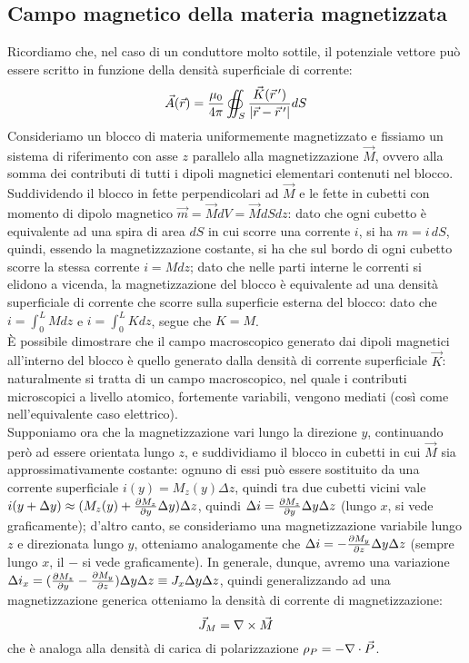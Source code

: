 \subsection{Campo magnetico della materia magnetizzata}

Ricordiamo che, nel caso di un conduttore molto sottile, il potenziale vettore può essere scritto in funzione della densità superficiale di corrente:
\begin{equation}
	\vec{A}(\vec{r}) = \frac{\mu_0}{4\pi} \oiint_S \frac{\vec{K}(\vec{r}\,')}{\left\lvert\vec{r} - \vec{r}\,'\right\rvert} dS
	\label{eq:12}
\end{equation}
Consideriamo un blocco di materia uniformemente magnetizzato e fissiamo un sistema di riferimento con asse $ z $ parallelo alla magnetizzazione $ \vec{M} $, ovvero alla somma dei contributi di tutti i dipoli magnetici elementari contenuti nel blocco. \\ 
%
Suddividendo il blocco in fette perpendicolari ad $ \vec{M} $ e le fette in cubetti con momento di dipolo magnetico $ \vec{m} = \vec{M} dV = \vec{M} dSdz $: dato che ogni cubetto è equivalente ad una spira di area $ dS $ in cui scorre una corrente $ i $, si ha $ m = i \,dS $, quindi, essendo la magnetizzazione costante, si ha che sul bordo di ogni cubetto scorre la stessa corrente $ i = M dz $; dato che nelle parti interne le correnti si elidono a vicenda, la magnetizzazione del blocco è equivalente ad una densità superficiale di corrente che scorre sulla superficie esterna del blocco: dato che $ i = \int_0^L M dz $ e $ i = \int_0^L K dz $, segue che $ K = M $. \\ 
%
È possibile dimostrare che il campo macroscopico generato dai dipoli magnetici all'interno del blocco è quello generato dalla densità di corrente superficiale $ \vec{K} $: naturalmente si tratta di un campo macroscopico, nel quale i contributi microscopici a livello atomico, fortemente variabili, vengono mediati (così come nell'equivalente caso elettrico). \\ 
%
Supponiamo ora che la magnetizzazione vari lungo la direzione $ y $, continuando però ad essere orientata lungo $ z $, e suddividiamo il blocco in cubetti in cui $ \vec{M} $ sia approssimativamente costante: ognuno di essi può essere sostituito da una corrente superficiale $ i(y) = M_z(y) \Delta z $, quindi tra due cubetti vicini vale $ i(y+\Delta y) \approx (M_z(y) + \frac{\partial M_z}{\partial y}\Delta y) \Delta z $, quindi $ \Delta i = \frac{\partial M_z}{\partial y} \Delta y \Delta z $ (lungo $ x $, si vede graficamente); d'altro canto, se consideriamo una magnetizzazione variabile lungo $ z $ e direzionata lungo $ y $, otteniamo analogamente che $ \Delta i = - \frac{\partial M_y}{\partial z} \Delta y \Delta z $ (sempre lungo $ x $, il $ - $ si vede graficamente). In generale, dunque, avremo una variazione $ \Delta i_x = (\frac{\partial M_z}{\partial y} - \frac{\partial M_y}{\partial z}) \Delta y \Delta z \equiv J_x \Delta y \Delta z $, quindi generalizzando ad una magnetizzazione generica otteniamo la densità di corrente di magnetizzazione:
\begin{equation}
	\vec{J}_M = \nabla\times\vec{M}
	\label{eq:13}
\end{equation}
che è analoga alla densità di carica di polarizzazione $ \rho_P = -\nabla\cdot\vec{P} $. 

